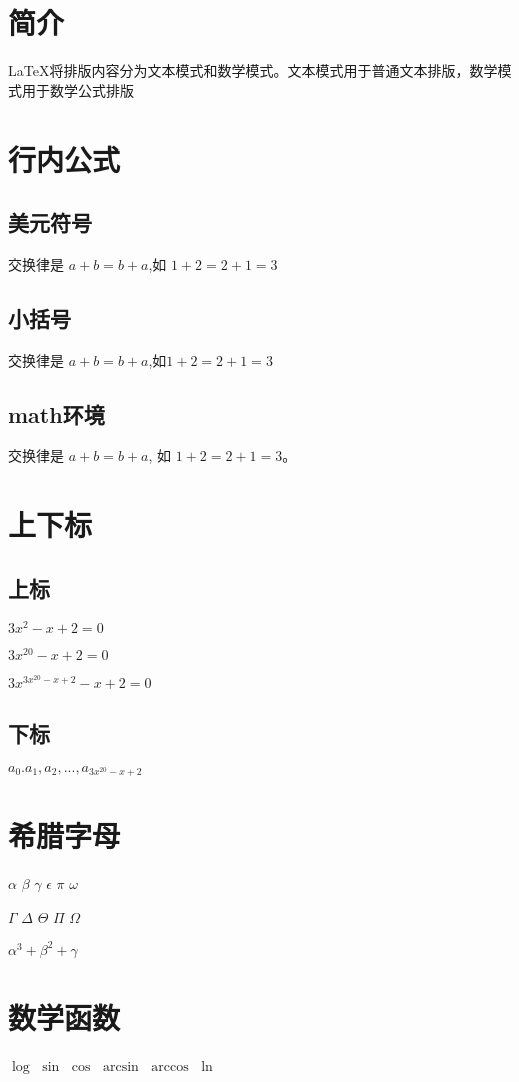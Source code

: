 \documentclass{article}
\begin{document}
	\section{简介}
	\LaTeX{}将排版内容分为文本模式和数学模式。文本模式用于普通文本排版，数学模式用于数学公式排版
	\section{行内公式}
	\subsection{美元符号}
	交换律是 $a + b =b + a$,如 $1 + 2 =2 +1 =3$
	\subsection{小括号}
	交换律是 \(a + b =b + a\),如\(1 + 2 =2 +1 =3\) 
	\subsection{math环境}
	交换律是 \begin{math}  a + b =b + a \end{math},
	如 \begin{math} 1 + 2 =2 +1 =3	\end{math}。
	\section{上下标}
	\subsection{上标}
	
	$3x^2 - x + 2 = 0$
	
	$3x^{20} - x + 2 = 0$
	
	$3x^{3x^{20} - x + 2 } - x + 2 = 0$
	\subsection{下标}
	$a_0.a_1,a_2,...,a_{3x^{20} - x + 2}$
	\section{希腊字母}
	$\alpha $
	$\beta$
	$\gamma$
	$\epsilon$
	$\pi$
	$\omega$
	
	$\Gamma$
	$\Delta$
	$\Theta$
	$\Pi$
	$\Omega$
	
	$\alpha^3 + \beta^2 + \gamma$
	\section{数学函数}
	$\log$
	$\sin$
	$\cos$
	$\arcsin$
	$\arccos$
	$\ln$
	
\end{document}
